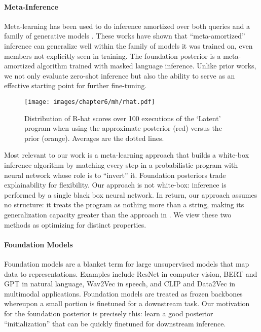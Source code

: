 \paragraph{Meta-Inference} Meta-learning has been used to do inference amortized over both queries and a family of generative models \cite{choi2019meta,gordon2018meta,iakovleva2020meta}. These works have shown that ``meta-amortized'' inference can generalize well within the family of models it was trained on, even members not explicitly seen in training. The foundation posterior is a meta-amortized algorithm trained with masked language inference. Unlike prior works, we not only evaluate zero-shot inference but also the ability to serve as an effective starting point for further fine-tuning.

\begin{figure}[h!]
  \begin{center}
  \texttt{[image: images/chapter6/mh/rhat.pdf]}
  \end{center}
  \caption{Distribution of R-hat scores over 100 executions of the `Latent' program when using the approximate posterior (red) versus the prior (orange). Averages are the dotted lines.}
  \label{fig:mh:accept}
\end{figure}

Most relevant to our work is a meta-learning approach \cite{che2021meta} that builds a white-box inference algorithm by matching every step in a probabilistic program with neural network whose role is to ``invert'' it. Foundation posteriors trade explainability for flexibility. Our approach is not white-box: inference is performed by a single black box neural network. In return, our approach assumes no structure: it treats the program as nothing more than a  string, making its generalization capacity greater than the approach in \cite{che2021meta}. We view these two methods as optimizing for distinct properties.

\paragraph{Foundation Models} Foundation models \cite{bommasani2021opportunities} are a blanket term for large unsupervised models that map data to representations. Examples include ResNet \cite{he2016deep} in computer vision, BERT \cite{devlin2018bert} and GPT \cite{brown2020language,radford2019language} in natural language, Wav2Vec \cite{schneider2019wav2vec,baevski2020wav2vec} in speech, and CLIP \cite{radford2021learning} and Data2Vec \cite{baevski2022data2vec} in multimodal applications. Foundation models are treated as frozen backbones whereupon a small portion is finetuned  for a downstream task. Our motivation for the foundation posterior is precisely this: learn a good posterior ``initialization'' that can be quickly finetuned for  downstream inference.

